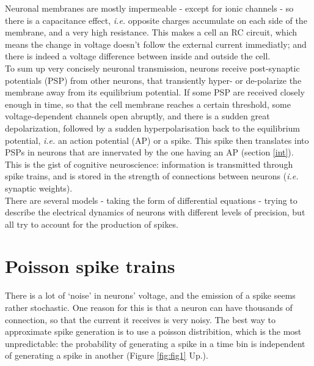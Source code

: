 \documentclass{article}
\begin{document}
\indent Neuronal membranes are mostly impermeable - except for ionic channels - so there is a capacitance effect, \textit{i.e.} opposite charges accumulate on each side of the membrane, and a very high resistance. This makes a cell an RC circuit, which means the change in voltage doesn't follow the external current immediatly; and there is indeed a voltage difference between inside and outside the cell.\\
\indent To sum up very concisely neuronal transmission, neurons receive post-synaptic potentials (PSP) from other neurons, that transiently hyper- or de-polarize the membrane away from its equilibrium potential. If some PSP are received closely enough in time, so that the cell membrane reaches a certain threshold, some voltage-dependent channels open abruptly, and there is a sudden great depolarization, followed by a sudden hyperpolarisation back to the equilibrium potential, \textit{i.e.} an action potential (AP) or a spike. This spike then translates into PSPs in neurons that are innervated by the one having an AP (section \ref{int}).\\
\indent This is the gist of cognitive neuroscience: information is transmitted through spike trains, and is stored in the strength of connections between neurons (\textit{i.e.} synaptic weights).\\

There are several models - taking the form of differential equations - trying to describe the electrical dynamics of neurons with different levels of precision, but all try to account for the production of spikes.

\section{Poisson spike trains}\label{spikes}
There is a lot of `noise' in neurons' voltage, and the emission of a spike seems rather stochastic. One reason for this is that a neuron can have thousands of connection, so that the current it receives is very noisy. The best way to approximate spike generation is to use a poisson distribition, which is the most unpredictable: the probability of generating a spike in a time bin is independent of generating a spike in another (Figure \ref{fig:fig1} Up.).
\end{document}
